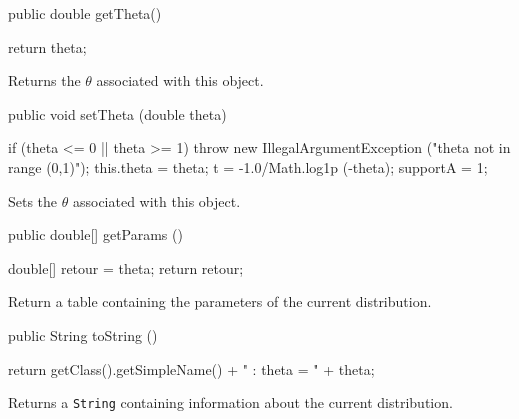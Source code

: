 \begin{code}

   public double getTheta()\begin{hide} {
      return theta;
   }
\end{hide}
\end{code}
\begin{tabb}
   Returns the $\theta$ associated with this object.
\end{tabb}
\begin{code}

   public void setTheta (double theta)\begin{hide} {
      if (theta <= 0 || theta >= 1)
         throw new IllegalArgumentException ("theta not in range (0,1)");
      this.theta = theta;
      t = -1.0/Math.log1p (-theta);
      supportA = 1;
   }\end{hide}
\end{code}
\begin{tabb}
   Sets the $\theta$ associated with this object.
\end{tabb}
\begin{code}

   public double[] getParams ()\begin{hide} {
      double[] retour = {theta};
      return retour;
   }\end{hide}
\end{code}
\begin{tabb}
   Return a table containing the parameters of the current distribution.
\end{tabb}
\begin{hide}\begin{code}

   public String toString ()\begin{hide} {
      return getClass().getSimpleName() + " : theta = " + theta;
   }\end{hide}
\end{code}
\begin{tabb}
   Returns a \texttt{String} containing information about the current distribution.
\end{tabb}\end{hide}
\begin{code}\begin{hide}
}\end{hide}
\end{code}
